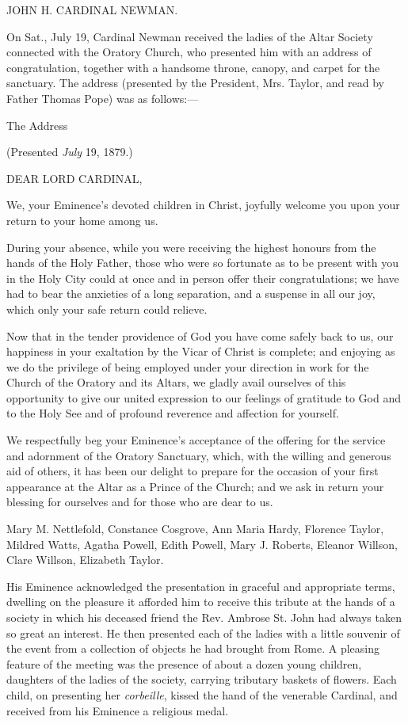 JOHN H. CARDINAL NEWMAN.


On Sat., July 19, Cardinal Newman received the ladies of the Altar
Society connected with the Oratory Church, who presented him with an
address of congratulation, together with a handsome throne, canopy,
and carpet for the sanctuary. The address (presented by the President,
Mrs. Taylor, and read by Father Thomas Pope) was as follows:—

The Address

(Presented \emph{July} 19, 1879.)

DEAR LORD CARDINAL,

We, your Eminence's devoted children in Christ, joyfully welcome you
upon your return to your home among us.

During your absence, while you were receiving the highest honours
from the hands of the Holy Father, those who were so fortunate as to
be present with you in the Holy City could at once and in person offer
their congratulations; we have had to bear the anxieties of a long
separation, and a suspense in all our joy, which only your safe return
could relieve.

Now that in the tender providence of God you have come safely back
to us, our happiness in your exaltation by the Vicar of Christ is
complete; and enjoying as we do the privilege of being employed under
your direction in work for the Church of the Oratory and its Altars,
we gladly avail ourselves of this opportunity to give our united
expression to our feelings of gratitude to God and to the Holy See and
of profound reverence and affection for yourself.

We respectfully beg your Eminence's acceptance of the offering for
the service and adornment of the Oratory Sanctuary, which, with the
willing and generous aid of others, it has been our delight to prepare
for the occasion of your first appearance at the Altar as a Prince of
the Church; and we ask in return your blessing for ourselves and for
those who are dear to us.

Mary M. Nettlefold, Constance Cosgrove, Ann Maria Hardy, Florence
Taylor, Mildred Watts, Agatha Powell, Edith Powell, Mary J. Roberts,
Eleanor Willson, Clare Willson, Elizabeth Taylor.

His Eminence acknowledged the presentation in graceful and
appropriate terms, dwelling on the pleasure it afforded him to receive
this tribute at the hands of a society in which his deceased friend
the Rev. Ambrose St. John had always taken so great an interest. He
then presented each of the ladies with a little souvenir of the event
from a collection of objects he had brought from Rome. A pleasing
feature of the meeting was the presence of about a dozen young
children, daughters of the ladies of the society, carrying tributary
baskets of flowers. Each child, on presenting her \emph{corbeille},
kissed the hand of the venerable Cardinal, and received from his
Eminence a religious medal.

